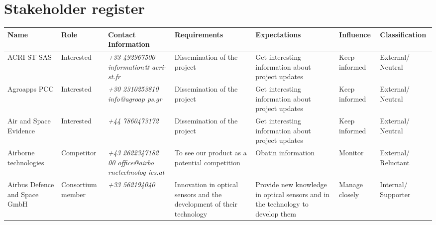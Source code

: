 \section{Stakeholder register}

\begin{center}
	\begin{longtable}{>{\raggedright\arraybackslash}p{2.2cm} >{\raggedright\arraybackslash}p{1.5cm} >{\raggedright\arraybackslash}p{2cm} | >{\raggedright\arraybackslash}p{2.2cm} >{\raggedright\arraybackslash}p{2cm} >{\raggedright\arraybackslash}p{1.4cm} >{\raggedright\arraybackslash}p{2.1cm}}
		\toprule[2pt]
		
		\textbf{Name} & \textbf{Role} & \textbf{Contact Information} & \textbf{Requirements} & \textbf{Expectations} & \textbf{Influence} & \textbf{Classification} \\ \midrule[1.5pt] \endhead
		
		ACRI-ST SAS & Interested & \textit{+33 492967500 \newline \newline information@ acri-st.fr} & Dissemination of the project & Get interesting information about project updates & Keep informed & External/ Neutral \\ \hline
		
		Agroapps PCC & Interested & \textit{+30 2310253810 \newline \newline info@agroap ps.gr} & Dissemination of the project & Get interesting information about project updates & Keep informed & External/ Neutral \\ \hline
		
		Air and Space Evidence & Interested & \textit{+44 7860473172} & Dissemination of the project & Get interesting information about project updates & Keep informed & External/ Neutral \\ \hline
		
		Airborne technologies & Competitor & \textit{+43 2622347182 00 \newline \newline office@airbo rnetechnolog ies.at} & To see our product as a potential competition & Obatin information & Monitor & External/ Reluctant \\ \hline
		
		Airbus Defence and Space GmbH & Consortium member & \textit{+33 562194040} & Innovation in optical sensors and the development of their technology & Provide new knowledge in optical sensors and in the technology to develop them & Manage closely & Internal/ Supporter \\ \hline
		

\end{longtable}
\end{center}
